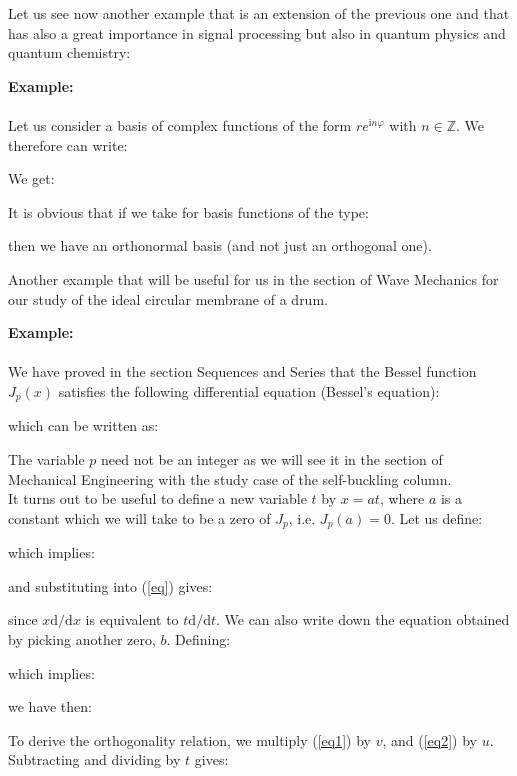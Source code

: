 	Let us see now another example that is an extension of the previous one and that has also a great importance in signal processing but also in quantum physics and quantum chemistry:
	\begin{tcolorbox}[colframe=black,colback=white,sharp corners]
	\textbf{{\Large {}}Example:}\\\\
	Let us consider a basis of complex functions of the form $r e^{\mathrm{i}n\varphi}$ with $n\in\mathbb{Z}$. We therefore can write:
	
	We get:
	
	It is obvious that if we take for basis functions of the type:
	
	then we have an orthonormal basis (and not just an orthogonal one).
	\end{tcolorbox}
	\label{orthogonality of bessel functions}
	Another example that will be useful for us in the section of Wave Mechanics for our study of the ideal circular membrane of a drum.
	\begin{tcolorbox}[colframe=black,colback=white,sharp corners]
	\textbf{{\Large {}}Example:}\\\\
	We have proved in the section Sequences and Series that the Bessel function $J_p(x)$ satisfies the following differential equation (Bessel's equation):
	
	which can be written as:
	
	The variable $p$ need not be an integer as we will see it in the section of Mechanical Engineering with the study case of the self-buckling column.\\
	
	It turns out to be useful to define a new variable $t$ by $x = a t$, where $a$ is a constant which we will take to be a zero of $J_p$, i.e. $J_p(a) = 0$. Let us define:
	
	which implies:
	
	and substituting into (\ref{eq}) gives:
	
	since $x \mathrm{d}/\mathrm{d}x$ is equivalent to $t \mathrm{d}/\mathrm{d}t$.
	We can also write down the equation obtained by picking another zero, $b$. Defining:
	
	which implies:
	
	we have then:
	
	To derive the orthogonality relation, we multiply (\ref{eq1}) by $v$, and (\ref{eq2}) by $u$. Subtracting and dividing by $t$ gives:
	\end{tcolorbox}
	
